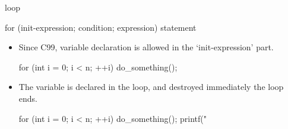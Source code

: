 \documentclass[handout]{beamer}
\begin{document}
\begin{frame}[fragile]{ loop}
    \begin{cpp}
for (init-expression; condition; expression)
    statement
    \end{cpp}
    \begin{itemize}
        \item Since C99, variable declaration is allowed in the `init-expression' part.
        \begin{cpp}
for (int i = 0; i < n; ++i)
    do_something();
        \end{cpp}
        \pause
        \item The variable  is declared in the  loop, and destroyed immediately the loop ends.
        \begin{cpp}
for (int i = 0; i < n; ++i)
    do_something();
printf("%
        \end{cpp}
    \end{itemize}
\end{frame}
\end{document}
